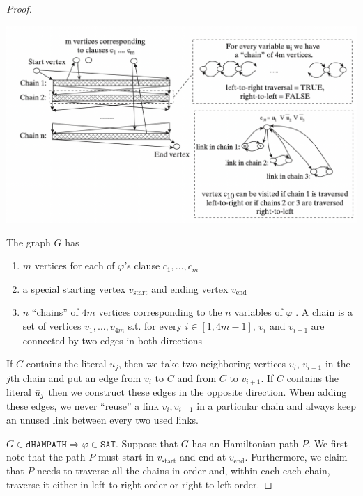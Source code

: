 \documentclass[11pt]{article}
\def \start {\text{start}}
\def \tend {\text{end}}
\def \SAT {\texttt{SAT}}
\def \dHAMPATH {\texttt{dHAMPATH}}
\begin{document}
\begin{proof}
\begin{center}
\includegraphics[width=.8\textwidth]{./4.png}
\end{center}

The graph \(G\) has
\begin{enumerate}
\item \(m\) vertices for each of \(\varphi\)'s clause \(c_1,\dots,c_m\)
\item a special starting vertex \(v_{\start}\) and ending vertex \(v_{\tend}\)
\item \(n\) ``chains'' of \(4m\) vertices corresponding to the \(n\) variables of \(\varphi\) . A chain is a
set of vertices \(v_1,\dots,v_{4m}\) s.t. for every \(i\in[1,4m-1]\), \(v_i\)
and \(v_{i+1}\) are connected by two edges in both directions
\end{enumerate}


If \(C\) contains the literal \(u_j\), then we take two neighboring
vertices \(v_i\), \(v_{i+1}\) in the \(j\)th chain and put an edge from \(v_i\) to \(C\) and
from \(C\) to \(v_{i+1}\). If \(C\) contains the literal \(\baru_j\) then we construct these
edges in the opposite direction. When adding these edges, we never ``reuse'' a
link \(v_i, v_{i+1}\) in a particular chain and always keep an unused link between every two
used links.


\(G\in\dHAMPATH\Rightarrow\varphi\in\SAT\). Suppose that \(G\) has an Hamiltonian path \(P\).
We first note that the path \(P\) must start in \(v_{\start}\) and end at \(v_{\tend}\).
Furthermore, we claim that \(P\) needs to traverse all the chains in order and, within each
each chain, traverse it either in left-to-right order or right-to-left order.
\end{proof}
\end{document}
